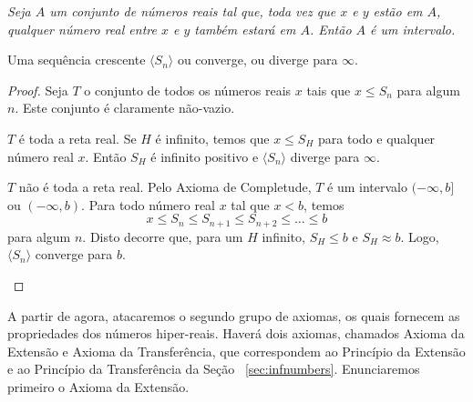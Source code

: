 
\emph{
Seja $A$ um conjunto de números reais tal que, toda vez que $x$ e $y$
estão em $A$, qualquer número real entre $x$ e $y$ também estará em $A$.
Então $A$ é um intervalo.
}

\begin{theor}
Uma sequência crescente $\langle S_n \rangle$ ou converge, ou diverge para
$\infty$.
\end{theor}

\begin{proof}
Seja $T$ o conjunto de todos os números reais $x$ tais que $x \le S_n$ para
algum $n$. Este conjunto é claramente não-vazio.

\begin{caseanalysis}
\item $T$ é toda a reta real. Se $H$ é infinito, temos que $x \le S_H$
para todo e qualquer número real $x$. Então $S_H$ é infinito positivo e
$\langle S_n \rangle$ diverge para $\infty$.

\item $T$ não é toda a reta real. Pelo Axioma de Completude,
$T$ é um intervalo $(-\infty,b]$ ou $(-\infty,b)$. Para todo número
real $x$ tal que $x < b$, temos
\[
	x \le S_n \le S_{n+1} \le S_{n+2} \le \ldots \le b
\]
para algum $n$. Disto decorre que, para um $H$ infinito, $S_H \le b$ e
$S_H \approx b$. Logo, $\langle S_n \rangle$ converge para $b$.
\end{caseanalysis}%
\end{proof}

A partir de agora, atacaremos o segundo grupo de axiomas, os quais
fornecem as propriedades dos números hiper-reais. Haverá dois axiomas,
chamados Axioma da Extensão e Axioma da Transferência, que correspondem
ao Princípio da Extensão e ao Princípio da Transferência da Seção%
~\ref{sec:infnumbers}. Enunciaremos primeiro o Axioma da Extensão.


